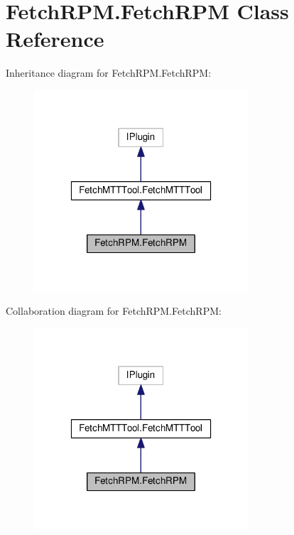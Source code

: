 \hypertarget{class_fetch_r_p_m_1_1_fetch_r_p_m}{\section{Fetch\-R\-P\-M.\-Fetch\-R\-P\-M Class Reference}
\label{class_fetch_r_p_m_1_1_fetch_r_p_m}
}


Inheritance diagram for Fetch\-R\-P\-M.\-Fetch\-R\-P\-M\-:
\nopagebreak
\begin{figure}[H]
\begin{center}
\leavevmode
\includegraphics[width=226pt]{class_fetch_r_p_m_1_1_fetch_r_p_m__inherit__graph}
\end{center}
\end{figure}


Collaboration diagram for Fetch\-R\-P\-M.\-Fetch\-R\-P\-M\-:
\nopagebreak
\begin{figure}[H]
\begin{center}
\leavevmode
\includegraphics[width=226pt]{class_fetch_r_p_m_1_1_fetch_r_p_m__coll__graph}
\end{center}
\end{figure}
